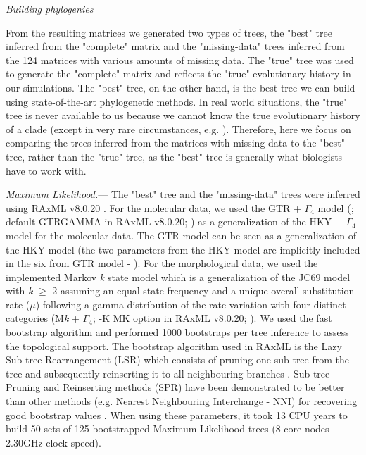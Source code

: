\documentclass[12pt,letterpaper]{article}
\renewcommand{\subsection}[1]{%
\bigskip
\begin{center}
\begin{large}
\normalfont\itshape #1
\end{large}
\end{center}}
\renewcommand{\subsubsection}[1]{%
\vspace{2ex}
\noindent
\textit{#1.}---}
\begin{document}

\subsection{Building phylogenies}
From the resulting matrices we generated two types of trees, the "best" tree inferred from the "complete" matrix and the "missing-data" trees inferred from the 124 matrices with various amounts of missing data.
The "true" tree was used to generate the "complete" matrix and reflects the "true" evolutionary history in our simulations.
The "best" tree, on the other hand, is the best tree we can build using state-of-the-art phylogenetic methods.
In real world situations, the "true" tree is never available to us because we cannot know the true evolutionary history of a clade (except in very rare circumstances, e.g. \citealt{rozen2005}).
Therefore, here we focus on comparing the trees inferred from the matrices with missing data to the "best" tree, rather than the "true" tree, as the "best" tree is generally what biologists have to work with.

\subsubsection{Maximum Likelihood}
The "best" tree and the "missing-data" trees were inferred using RAxML v8.0.20 \citep{Stamatakis21012014}.
For the molecular data, we used the GTR + $\Gamma_4$ model (\citealt{tavare1986}; default GTRGAMMA in RAxML v8.0.20; \citealt{Stamatakis21012014}) as a generalization of the HKY + $\Gamma_4$ model \citep{HKY85} for the molecular data.
The GTR model can be seen as a generalization of the HKY model (the two parameters from the HKY model are implicitly included in the six from GTR model - \citealt{stamatakisa2008}).
For the morphological data, we used the implemented Markov \textit{k} state model \citep{lewisa2001} which is a generalization of the JC69 model \citep{jc69} with \textit{k} $\geq$ 2 assuming an equal state frequency and a unique overall substitution rate ($\mu$) following a gamma distribution of the rate variation with four distinct categories (M\textit{k} + $\Gamma_4$; -K MK option in RAxML v8.0.20; \citealt{Stamatakis21012014}).
We used the fast bootstrap algorithm and performed 1000 bootstraps per tree inference to assess the topological support. %
The bootstrap algorithm used in RAxML is the Lazy Sub-tree Rearrangement (LSR) which consists of pruning one sub-tree from the tree and subsequently reinserting it to all neighbouring branches \citep{stamatakisa2008}.
Sub-tree Pruning and Reinserting methods (SPR) have been demonstrated to be better than other methods (e.g. Nearest Neighbouring Interchange - NNI) for recovering good bootstrap values \citep{salamin2003}.
When using these parameters, it took 13 CPU years to build 50 sets of 125 bootstrapped Maximum Likelihood trees (8 core nodes 2.30GHz clock speed).
\end{document}
